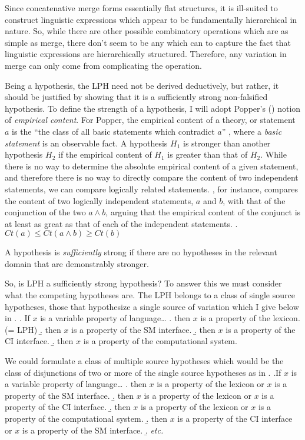\documentclass[MilwayThesis]{subfiles}
\begin{document}
Since concatenative merge forms essentially flat structures, it is ill-suited to construct linguistic expressions which appear to be fundamentally hierarchical in nature.
So, while there are other possible combinatory operations which are as simple as merge, there don't seem to be any which can to capture the fact that linguistic expressions are hierarchically structured.
Therefore, any variation in merge can only come from complicating the operation.

Being a hypothesis, the LPH need not be derived deductively, but rather, it should be justified by showing that it is a sufficiently strong non-falsified hypothesis.
To define the strength of a hypothesis, I will adopt Popper's (\citeyear{popper1959logic,popper2014conjectures}) notion of \textit{empirical content}.
For Popper, the empirical content of a theory, or statement $a$ is the ``the class of all basic statements which contradict $a$'' \parencite[315]{popper2014conjectures}, where a \textit{basic statement} is an observable fact.
A hypothesis $H_1$ is stronger than another hypothesis $H_2$ if the empirical content of $H_1$ is greater than that of $H_2$.
While there is no way to determine the absolute empirical content of a given statement, and therefore there is no way to directly compare the content of two independent statements, we can compare logically related statements.
\textcite[295]{popper2014conjectures}, for instance, compares the content of two logically independent statements, $a$ and $b$, with that of the conjunction of the two $a\wedge b$, arguing that the empirical content of the conjunct is at least as great as that of each of the independent statements.
\ex. $Ct(a) \leq Ct(a\wedge b) \geq Ct(b)$

A hypothesis is \textit{sufficiently} strong if there are no hypotheses in the relevant domain that are demonstrably stronger.

So, is LPH a sufficiently strong hypothesis?
To answer this we must consider what the competing hypotheses are.
The LPH belongs to a class of single source hypotheses, those that hypothesize a single source of variation which I give below in \Next.
\ex. If $x$ is a variable property of language\ldots
\a. then $x$ is a property of the lexicon. (= LPH)
\b. then $x$ is a property of the SM interface.
\b. then $x$ is a property of the CI interface.
\b. then $x$ is a property of the computational system.

We could formulate a class of multiple source hypotheses which would be the class of disjunctions of two or more of the single source hypotheses as in \Next.
\ex.If $x$ is a variable property of language\ldots
\a. then $x$ is a property of the lexicon or $x$ is a property of the SM interface.
\b. then $x$ is a property of the lexicon or $x$ is a property of the CI interface. 
\b. then $x$ is a property of the lexicon or $x$ is a property of the computational system. 
\b. then $x$ is a property of the CI interface or $x$ is a property of the SM interface.
\b. \textit{etc.} 
\end{document}
